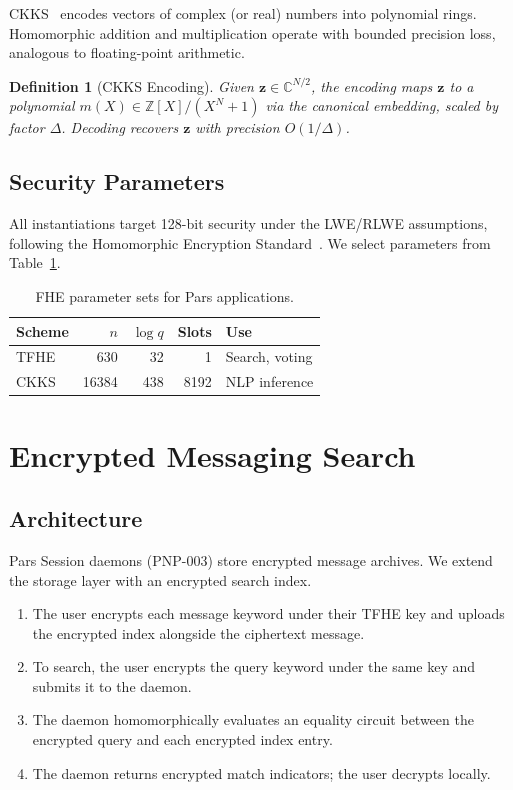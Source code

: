 \documentclass[11pt,a4paper]{article}
\newtheorem{definition}{Definition}[section]
\begin{document}
CKKS~\cite{cheon2017ckks} encodes vectors of complex (or real) numbers
into polynomial rings.  Homomorphic addition and multiplication operate
with bounded precision loss, analogous to floating-point arithmetic.

\begin{definition}[CKKS Encoding]
    Given $\mathbf{z} \in \mathbb{C}^{N/2}$, the encoding maps
    $\mathbf{z}$ to a polynomial $m(X) \in \mathbb{Z}[X]/(X^N+1)$ via
    the canonical embedding, scaled by factor $\Delta$.  Decoding
    recovers $\mathbf{z}$ with precision $O(1/\Delta)$.
\end{definition}

\subsection{Security Parameters}

All instantiations target 128-bit security under the LWE/RLWE
assumptions, following the Homomorphic Encryption Standard~\cite{hes2018}.
We select parameters from Table~\ref{tab:params}.

\begin{table}[h]
\centering
\caption{FHE parameter sets for Pars applications.}
\label{tab:params}
\begin{tabular}{@{}lrrrl@{}}
\toprule
\textbf{Scheme} & $n$ & $\log q$ & \textbf{Slots} & \textbf{Use} \\
\midrule
TFHE   & 630  & 32  & 1    & Search, voting \\
CKKS   & 16384 & 438 & 8192 & NLP inference \\
\bottomrule
\end{tabular}
\end{table}

\section{Encrypted Messaging Search}
\label{sec:search}

\subsection{Architecture}

Pars Session daemons (PNP-003) store encrypted message archives.  We
extend the storage layer with an encrypted search index.

\begin{enumerate}
    \item The user encrypts each message keyword under their TFHE key
    and uploads the encrypted index alongside the ciphertext message.
    \item To search, the user encrypts the query keyword under the same
    key and submits it to the daemon.
    \item The daemon homomorphically evaluates an equality circuit between
    the encrypted query and each encrypted index entry.
    \item The daemon returns encrypted match indicators; the user decrypts
    locally.
\end{enumerate}
\end{document}
